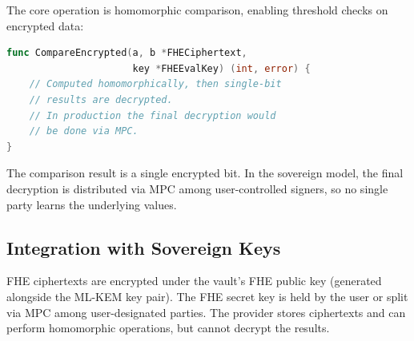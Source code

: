 The core operation is homomorphic comparison, enabling threshold checks
on encrypted data:

\begin{lstlisting}[language=Go,caption={fhe.go: encrypted comparison}]
func CompareEncrypted(a, b *FHECiphertext,
                      key *FHEEvalKey) (int, error) {
    // Computed homomorphically, then single-bit
    // results are decrypted.
    // In production the final decryption would
    // be done via MPC.
}
\end{lstlisting}

The comparison result is a single encrypted bit.  In the sovereign model,
the final decryption is distributed via MPC among user-controlled signers,
so no single party learns the underlying values.

\subsection{Integration with Sovereign Keys}

FHE ciphertexts are encrypted under the vault's FHE public key (generated
alongside the ML-KEM key pair).  The FHE secret key is held by the user
or split via MPC among user-designated parties.  The provider stores
ciphertexts and can perform homomorphic operations, but cannot decrypt
the results.

